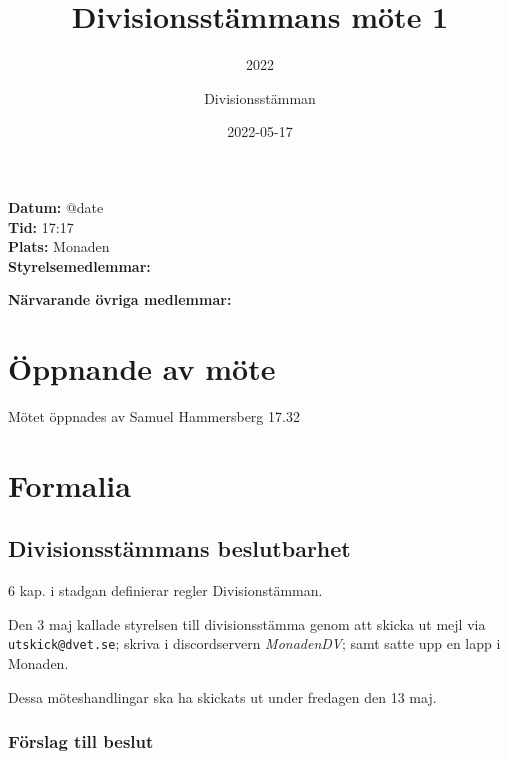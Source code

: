 \documentclass[protokoll]{dvd}
\begin{document}
\title{Divisionsstämmans möte 1}
\subtitle{2022}
\author{Divisionsstämman}
\date{2022-05-17}

\textbf{Datum:} \csname @date\endcsname\\
\textbf{Tid:} 17:17\\
\textbf{Plats:} Monaden\\
\textbf{Styrelsemedlemmar:}
\begin{närvarande_förtroendevalda}
\end{närvarande_förtroendevalda}

\textbf{Närvarande övriga medlemmar:}
\begin{närvarande_medlemmar}
\end{närvarande_medlemmar}

\newpage

\section{Öppnande av möte}

Mötet öppnades av Samuel Hammersberg 17.32

\section{Formalia}


\subsection{Divisionsstämmans beslutbarhet}

6 kap. i stadgan definierar regler Divisionstämman.

Den 3 maj kallade styrelsen till divisionsstämma genom att skicka ut mejl via \verb|utskick@dvet.se|; skriva i discordservern \emph{MonadenDV}; samt satte upp en lapp i Monaden.

Dessa möteshandlingar ska ha skickats ut under fredagen den 13 maj.

\subsubsection*{Förslag till beslut}
\end{document}
